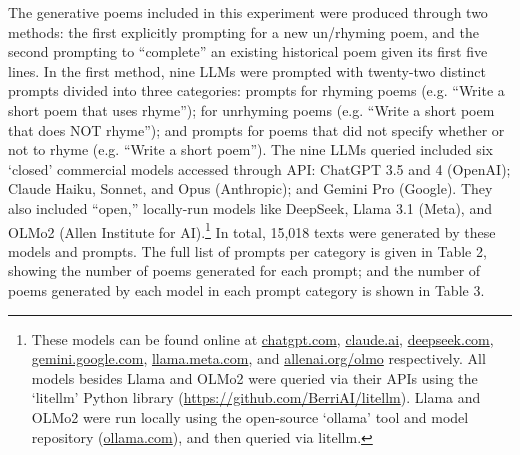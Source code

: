 \documentclass{simple-humanities}         %
\begin{document}



The generative poems included in this experiment were produced through two methods: the first explicitly prompting for a new un/rhyming poem, and the second prompting to ``complete'' an existing historical poem given its first five lines.
In the first method, nine LLMs were prompted with twenty-two distinct prompts divided into three categories: prompts for rhyming poems (e.g. ``Write a short poem that uses rhyme''); for unrhyming poems (e.g. ``Write a short poem that does NOT rhyme''); and prompts for poems that did not specify whether or not to rhyme (e.g. ``Write a short poem'').
The nine LLMs queried included six `closed' commercial models accessed through API: ChatGPT 3.5 and 4 (OpenAI); Claude Haiku, Sonnet, and Opus (Anthropic); and Gemini Pro (Google).
They also included ``open,'' locally-run models like DeepSeek, Llama 3.1 (Meta), and OLMo2 (Allen Institute for AI).\footnote{These models can be found online at \url{chatgpt.com}, \url{claude.ai}, \url{deepseek.com}, \url{gemini.google.com}, \url{llama.meta.com}, and \url{allenai.org/olmo} respectively. All models besides Llama and OLMo2 were queried via their APIs using the `litellm' Python library (\url{https://github.com/BerriAI/litellm}). Llama and OLMo2 were run locally using the open-source `ollama' tool and model repository (\url{ollama.com}), and then queried via litellm.}
In total, 15,018 texts were generated by these models and prompts.
The full list of prompts per category is given in Table 2, showing the number of poems generated for each prompt; and the number of poems generated by each model in each prompt category is shown in Table 3.
\end{document}
